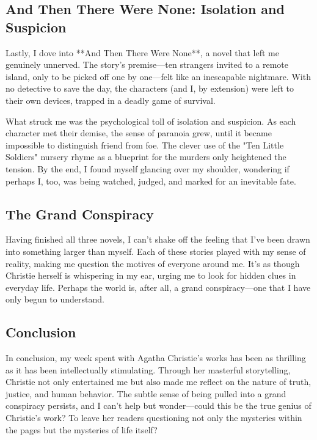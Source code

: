 \documentclass[a4paper]{article} 	%
\begin{document}
\subsection*{And Then There Were None: Isolation and Suspicion}

Lastly, I dove into **And Then There Were None**, a novel that left me genuinely unnerved. The story’s premise—ten strangers invited to a remote island, only to be picked off one by one—felt like an inescapable nightmare. With no detective to save the day, the characters (and I, by extension) were left to their own devices, trapped in a deadly game of survival.

What struck me was the psychological toll of isolation and suspicion. As each character met their demise, the sense of paranoia grew, until it became impossible to distinguish friend from foe. The clever use of the "Ten Little Soldiers" nursery rhyme as a blueprint for the murders only heightened the tension. By the end, I found myself glancing over my shoulder, wondering if perhaps I, too, was being watched, judged, and marked for an inevitable fate.

\subsection*{The Grand Conspiracy}

Having finished all three novels, I can't shake off the feeling that I've been drawn into something larger than myself. Each of these stories played with my sense of reality, making me question the motives of everyone around me. It’s as though Christie herself is whispering in my ear, urging me to look for hidden clues in everyday life. Perhaps the world is, after all, a grand conspiracy—one that I have only begun to understand.

\subsection*{Conclusion}

In conclusion, my week spent with Agatha Christie’s works has been as thrilling as it has been intellectually stimulating. Through her masterful storytelling, Christie not only entertained me but also made me reflect on the nature of truth, justice, and human behavior. The subtle sense of being pulled into a grand conspiracy persists, and I can't help but wonder—could this be the true genius of Christie’s work? To leave her readers questioning not only the mysteries within the pages but the mysteries of life itself?
\end{document}
